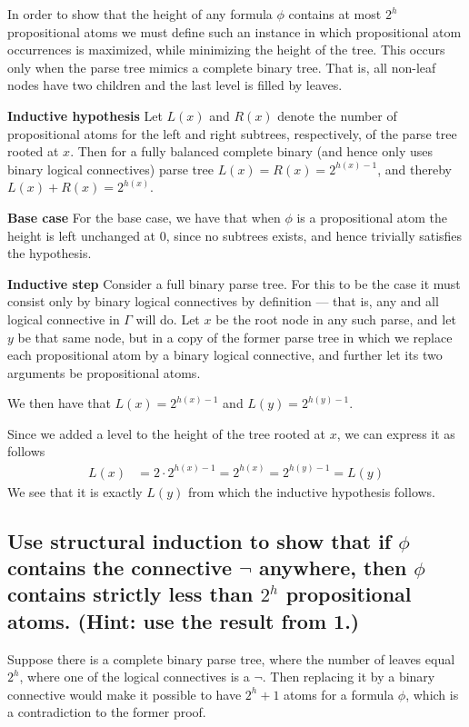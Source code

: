 \documentclass[11pt,a4paper]{article}
\begin{document}
In order to show that the height of any formula $\phi$ contains at most $2^h$
propositional atoms we must define such an instance in which propositional
atom occurrences is maximized, while minimizing the height of the tree. This
occurs only when the parse tree mimics a complete binary tree. That is, all
non-leaf nodes have two children and the last level is filled by leaves.

\begin{description}
	\item {\bf Inductive hypothesis} Let $L(x)$ and $R(x)$ denote the number
	of propositional atoms for the left and right subtrees, respectively, of
	the parse tree rooted at $x$. Then for a fully balanced complete binary
	(and hence only uses binary logical connectives) parse tree $L(x) = R(x)
	= 2^{h(x) - 1}$, and thereby $L(x) + R(x) = 2^{h(x)}$.
	
	\item {\bf Base case} For the base case, we have that when $\phi$ is a
	propositional atom the height is left unchanged at $0$, since no
	subtrees exists, and hence trivially satisfies the hypothesis.
	
	\item {\bf Inductive step} Consider a full binary parse tree. For this
	to be the case it must consist only by binary logical connectives by
	definition --- that is, any and all logical connective in $\Gamma$ will
	do. Let $x$ be the root node in any such parse, and let $y$ be that same
	node, but in a copy of the former parse tree in which we replace each
	propositional atom by a binary logical connective, and further let its
	two arguments be propositional atoms.

	We then have that $L(x) = 2^{h(x) - 1}$ and $L(y) = 2^{h(y) - 1}$.

	Since we added a level to the height of the tree rooted at $x$, we
	can express it as follows
	\begin{align*}
		L(x) &= 2 \cdot 2^{h(x) - 1} = 2^{h(x)} = 2^{h(y) - 1} = L(y)
	\end{align*}
	We see that it is exactly $L(y)$ from which the inductive hypothesis
	follows.
\end{description}

\subsection*{Use structural induction to show that if $\phi$ contains the
connective $\neg$ anywhere, then $\phi$ contains strictly less than $2^h$
propositional atoms. (Hint: use the result from 1.)}
Suppose there is a complete binary parse tree, where the number of leaves
equal $2^h$, where one of the logical connectives is a $\neg$. Then replacing
it by a binary connective would make it possible to have $2^h + 1$ atoms for
a formula $\phi$, which is a contradiction to the former proof.
\end{document}
